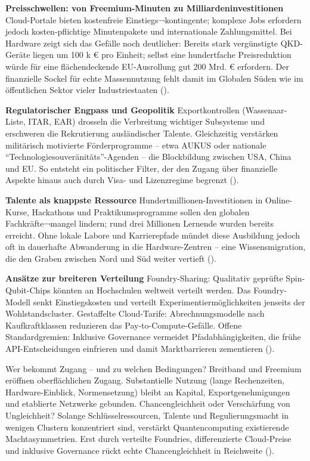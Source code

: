 \textbf{Preisschwellen: von Freemium-Minuten zu Milliardeninvestitionen}
Cloud-Portale bieten kostenfreie Einstiegs¬kontingente; komplexe Jobs erfordern jedoch kosten-pflichtige Minutenpakete und internationale Zahlungsmittel. Bei Hardware zeigt sich das Gefälle noch deutlicher: Bereits stark vergünstigte QKD-Geräte liegen um 100 k € pro Einheit; selbst eine hundertfache Preisreduktion würde für eine flächendeckende EU-Ausrollung gut 200 Mrd. € erfordern. Der finanzielle Sockel für echte Massennutzung fehlt damit im Globalen Süden wie im öffentlichen Sektor vieler Industriestaaten (\cite{seskirDemocratizationQuantumTechnologies2022}).

\textbf{Regulatorischer Engpass und Geopolitik}
Exportkontrollen (Wassenaar-Liste, ITAR, EAR) drosseln die Verbreitung wichtiger Subsysteme und erschweren die Rekrutierung ausländischer Talente. Gleichzeitig verstärken militärisch motivierte Förderprogramme – etwa AUKUS oder nationale “Technologiesouveränitäts”-Agenden – die Blockbildung zwischen USA, China und EU. So entsteht ein politischer Filter, der den Zugang über finanzielle Aspekte hinaus auch durch Visa- und Lizenzregime begrenzt (\cite{seskirDemocratizationQuantumTechnologies2022}).

\textbf{Talente als knappste Ressource}
Hundertmillionen-Investitionen in Online-Kurse, Hackathons und Praktikumsprogramme sollen den globalen Fachkräfte¬mangel lindern; rund drei Millionen Lernende wurden bereits erreicht. Ohne lokale Labore und Karrierepfade mündet diese Ausbildung jedoch oft in dauerhafte Abwanderung in die Hardware-Zentren – eine Wissensmigration, die den Graben zwischen Nord und Süd weiter vertieft (\cite{seskirDemocratizationQuantumTechnologies2022}).

\textbf{Ansätze zur breiteren Verteilung}
Foundry-Sharing: Qualitativ geprüfte Spin-Qubit-Chips könnten an Hochschulen weltweit verteilt werden. Das Foundry-Modell senkt Einstiegskosten und verteilt Experimentiermöglichkeiten jenseits der Wohlstandscluster.
Gestaffelte Cloud-Tarife: Abrechnungsmodelle nach Kaufkraftklassen reduzieren das Pay-to-Compute-Gefälle.
Offene Standardgremien: Inklusive Governance vermeidet Pfadabhängigkeiten, die frühe API-Entscheidungen einfrieren und damit Marktbarrieren zementieren (\cite{seskirDemocratizationQuantumTechnologies2022}).

Wer bekommt Zugang – und zu welchen Bedingungen? Breitband und Freemium eröffnen oberflächlichen Zugang. Substantielle Nutzung (lange Rechenzeiten, Hardware-Einblick, Normensetzung) bleibt an Kapital, Exportgenehmigungen und etablierte Netzwerke gebunden.
Chancengleichheit oder Verschärfung von Ungleichheit? Solange Schlüsselressourcen, Talente und Regulierungsmacht in wenigen Clustern konzentriert sind, verstärkt Quantencomputing existierende Machtasymmetrien. Erst durch verteilte Foundries, differenzierte Cloud-Preise und inklusive Governance rückt echte Chancengleichheit in Reichweite (\cite{seskirDemocratizationQuantumTechnologies2022}).

